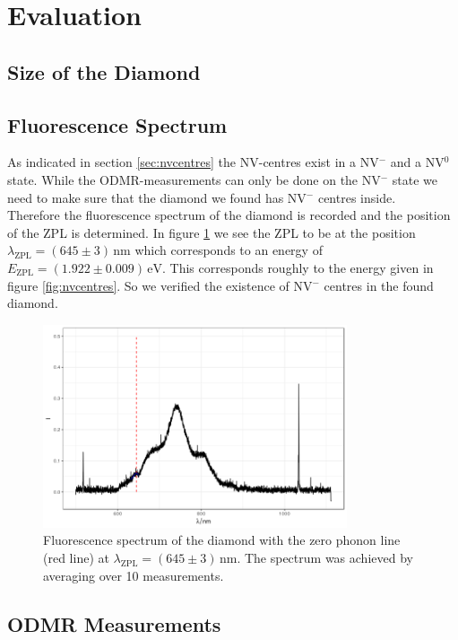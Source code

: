 \section{Evaluation}
\subsection{Size of the Diamond}

\subsection{Fluorescence Spectrum}
As indicated in section \ref{sec:nvcentres} the NV-centres exist in a NV$^-$ and a NV$^0$ state. While the ODMR-measurements can only be done on the NV$^-$ state we need to make sure that the diamond we found has NV$^-$ centres inside.\\

Therefore the fluorescence spectrum of the diamond is recorded and the position of the ZPL is determined. In figure \ref{fig:fluorescence} we see the ZPL to be at the position $\lambda_\text{ZPL}=(645\pm3)\,\mathrm{nm}$ which corresponds to an energy of $E_\text{ZPL}=(1.922\pm0.009)\,\mathrm{eV}$. This corresponds roughly to the energy given in figure \ref{fig:nvcentres}. So we verified the existence of NV$^-$ centres in the found diamond.
\begin{figure}
	\centering
	\includegraphics[width=0.8\textwidth]{../figures/fluorescence.png}
	\caption[Fluorescence spectrum of the diamond]{Fluorescence spectrum of the diamond with the zero phonon line (red line) at $\lambda_\text{ZPL}=(645\pm3)\,\mathrm{nm}$. The spectrum was achieved by averaging over 10 measurements.}
	\label{fig:fluorescence}
\end{figure}

\subsection{ODMR Measurements}

